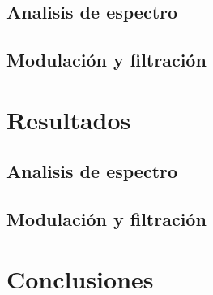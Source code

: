 \documentclass[11pt,a4paper]{article}
\begin{document}
\subsection{Analisis de espectro}



\subsection{Modulación y filtración}




\section{Resultados}
\label{sec:discusion}

\subsection{Analisis de espectro}



\subsection{Modulación y filtración}




\section{Conclusiones}
\label{sec:conclusiones}




\end{document}
